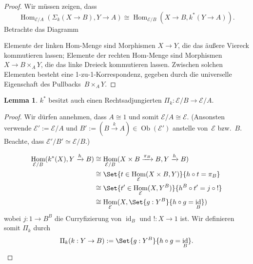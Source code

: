 \documentclass{article}
\theoremstyle{definition}
\newtheorem*{lem}{Lemma}
\theoremstyle{remark}
\newcommand{\coloneqq}{:=} %
\newcommand{\?}{\,{:}\,}
\renewcommand{\_}{\mathpunct{.}\,}
\DeclareMathOperator{\Ob}{Ob} %
\DeclareMathOperator{\Hom}{Hom} %
\DeclareMathOperator{\id}{id} %
\newcommand{\Eat}{\mathcal{E}} %
\begin{document}
\begin{proof}
Wir müssen zeigen, dass
\[
  \Hom_{\Eat/A}(\Sigma_k(X \to B), Y \to A) \cong \Hom_{\Eat/B}(X \to B, k^*(Y \to A)).
\]
Betrachte das Diagramm
\begin{center}\end{center}
Elemente der linken Hom-Menge sind Morphismen $X \to Y$, die das äußere Viereck kommutieren lassen; Elemente der rechten Hom-Menge sind Morphismen $X \to B \times_A Y$, die das linke Dreieck kommutieren lassen.
Zwischen solchen Elementen besteht eine 1-zu-1-Korrespondenz, gegeben durch die universelle Eigenschaft des Pullbacks~$B \times_A Y$.
\end{proof}

\begin{lem}
  $k^*$ besitzt auch einen Rechtsadjungierten $\Pi_k : \Eat/B \to \Eat/A$.
\end{lem}

\begin{proof}
  Wir dürfen annehmen, dass $A \cong 1$ und somit $\Eat/A \cong \Eat$. (Ansonsten verwende $\Eat' \coloneqq \Eat/A$ und $B' \coloneqq (B \xrightarrow{k} A) \in \Ob(\Eat')$ anstelle von~$\Eat$ bzw.~$B$. Beachte, dass $\Eat'/B' \simeq \Eat/B$.)

  \begin{align*}
    \Hom_{\Eat/B}(k^*(X), Y \xrightarrow{h} B)
    & \cong \Hom_{\Eat/B}(X \times B \xrightarrow{\pi_B} B, Y \xrightarrow{h} B) \\
    & \cong \Set{t \in \Hom_\Eat(X \times B, Y)}{h \circ t = \pi_B} \\
    & \cong \Set{t' \in \Hom_\Eat(X, Y^B)}{h^B \circ t' = j \circ {!}} \\
    & \cong \Hom_\Eat(X, \Set{g : Y^B}{h \circ g = \id_B})
  \end{align*}
  wobei $j : 1 \to B^B$ die Curryfizierung von $\id_B$ und $! : X \to 1$ ist.
  Wir definieren somit $\Pi_k$ durch
  \[
    \Pi_k(k : Y \to B) \coloneqq \Set{g : Y^B}{h \circ g = \id_B}.
    \qedhere
  \]
\end{proof}
\end{document}
